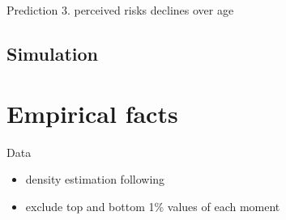 \documentclass{beamer}
\begin{document}
\begin{frame}{Prediction 3. perceived risks declines over age}
	
\end{frame}


\subsection{Simulation}	



\section{Empirical facts}


\begin{frame}{Data}
	\begin{table}
		\centering
		\caption{Survey of Consumer Expectations}
		\label{SCE_data_sum}
	\end{table}
	\begin{itemize}
		\item density estimation following \cite{engelberg_comparing_2009}
		\item exclude top and bottom 1\% values of each moment
	\end{itemize}
\end{frame}
\end{document}
